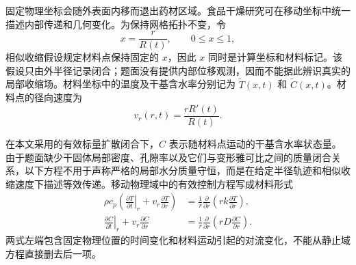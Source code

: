 \documentclass[withoutpreface,bwprint]{cumcmthesis}
\begin{document}
固定物理坐标会随外表面内移而退出药材区域。食品干燥研究可在移动坐标中统一描述内部传递和几何变化\cite{adrover2019general}。为保持网格拓扑不变，令
\begin{equation}
x=\frac{r}{R(t)},\qquad 0\leq x\leq 1,
\label{eq:normalized-radius}
\end{equation}
相似收缩假设规定材料点保持固定的 \(x\)，因此 \(x\) 同时是计算坐标和材料标记。该假设只由外半径记录闭合；题面没有提供内部位移观测，因而不能据此辨识真实的局部收缩场。材料坐标中的温度及干基含水率分别记为 \(\widetilde{T}(x,t)\) 和 \(\widetilde{C}(x,t)\)。材料点的径向速度为
\begin{equation}
v_r(r,t)=\frac{rR'(t)}{R(t)}.
\label{eq:material-velocity}
\end{equation}

在本文采用的有效标量扩散闭合下，\(C\) 表示随材料点运动的干基含水率状态量。由于题面缺少干固体局部密度、孔隙率以及它们与变形雅可比之间的质量闭合关系，以下方程不用于声称严格的局部水分质量守恒，而是在给定半径轨迹和相似收缩速度下描述等效传递。移动物理域中的有效控制方程写成材料形式
\begin{subequations}
\label{eq:q4-material-balance}
\begin{align}
\rho c_p\left(
\left.\frac{\partial T}{\partial t}\right|_r
+v_r\frac{\partial T}{\partial r}
\right)
&=\frac{1}{r}\frac{\partial}{\partial r}
\left(rk\frac{\partial T}{\partial r}\right),\\
\left.\frac{\partial C}{\partial t}\right|_r
+v_r\frac{\partial C}{\partial r}
&=\frac{1}{r}\frac{\partial}{\partial r}
\left(rD\frac{\partial C}{\partial r}\right).
\end{align}
\end{subequations}
两式左端包含固定物理位置的时间变化和材料运动引起的对流变化，不能从静止域方程直接删去后一项。
\end{document}
